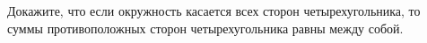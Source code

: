 \begin{ex}
	\begin{condition}
		Докажите, что если окружность касается всех сторон четырехугольника, то суммы противоположных сторон четырехугольника равны между собой.
	\end{condition}
\end{ex}
